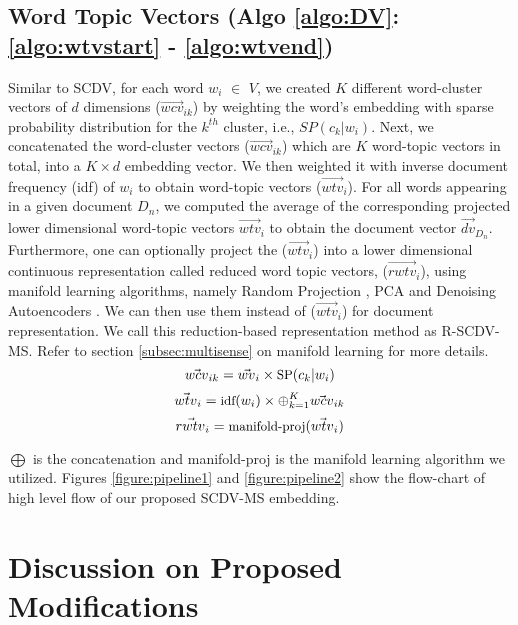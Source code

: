 \documentclass{ecai}
\newcommand{\method}{SCDV-MS}
\begin{document}
\subsection{Word Topic Vectors (Algo \ref{algo:DV}: \ref{algo:wtvstart} - \ref{algo:wtvend})}
\label{algo:wtv}
Similar to SCDV, for each word $w_i$ $\in$ $V$, we created $K$ different word-cluster vectors of $d$ dimensions ($\vec{wcv}_{ik}$) by weighting the word's embedding with sparse probability distribution for the $k^{th}$ cluster,  i.e., $SP(c_{k}|w_{i})$. Next, we concatenated the word-cluster vectors  ($\vec{wcv}_{ik}$) which are $K$ word-topic vectors in total, into a $K \times d$ embedding vector. We then weighted it with inverse document frequency (idf) of $w_i$ to obtain word-topic vectors ($\vec{wtv}_i$). For all words appearing in a given document $D_n$, we computed the average of the corresponding projected lower dimensional word-topic vectors  $\vec{wtv}_i$ to obtain the document vector $\vec{dv}_{D_n}$. Furthermore, one can optionally project the ($\vec{wtv}_i$) into a lower dimensional continuous representation called reduced word topic vectors, ($\vec{rwtv}_i$), using manifold learning algorithms, namely Random Projection \cite{achlioptas2003database}, PCA \cite{abdi2010principal} and Denoising Autoencoders \cite{vincent2010stacked}. We can then use them instead of ($\vec{wtv}_i$) for document representation. We call this reduction-based representation method as R-SCDV-MS. Refer to section \ref{subsec:multisense} on manifold learning for more details.
\begin{equation}
\small
\vec{wcv}_{ik} = \vec{wv}_i \times \text{SP}(c_{k}|w_{i})
\end{equation}
\begin{equation}
\small
\vec{wtv}_{i} = \text{idf}(w_i) \times \oplus_{k=1}^K \vec{wcv}_{ik}
\end{equation}
\begin{equation}
\small
\vec{rwtv}_{i} = \text{manifold-proj}(\vec{wtv}_{i}) 
\end{equation}

$\bigoplus$ is the concatenation and manifold-proj is the manifold learning algorithm we utilized. Figures \ref{figure:pipeline1} and \ref{figure:pipeline2} show the flow-chart of high level flow of our proposed \method{} embedding.



\section{Discussion on Proposed Modifications}
\label{sec:proposemodification} 
\end{document}
